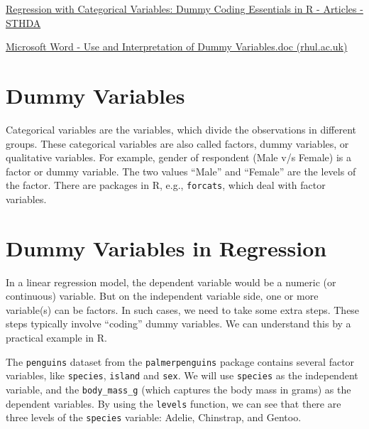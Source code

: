 \documentclass[
  letterpaper,
  paper =a4,
  twoside,
  openright,
  headsepline,
  footsepline,
  listof = totocnumbered,
  chapterprefix = true,
  firstiscover,
  parskip = full*]{scrbook}
\newenvironment{Shaded}{\begin{snugshade}}{\end{snugshade}}
\newcommand{\FunctionTok}[1]{\textcolor[rgb]{0.28,0.35,0.67}{#1}}
\newcommand{\NormalTok}[1]{\textcolor[rgb]{0.00,0.23,0.31}{#1}}
\newcommand{\OtherTok}[1]{\textcolor[rgb]{0.00,0.23,0.31}{#1}}
\newcommand{\SpecialCharTok}[1]{\textcolor[rgb]{0.37,0.37,0.37}{#1}}
\begin{document}
\href{http://sthda.com/english/articles/40-regression-analysis/163-regression-with-categorical-variables-dummy-coding-essentials-in-r/}{Regression
with Categorical Variables: Dummy Coding Essentials in R - Articles -
STHDA}

\href{http://www.personal.rhul.ac.uk/uhte/006/ec2203/Use\%20and\%20Interpretation\%20of\%20Dummy\%20Variables.pdf}{Microsoft
Word - Use and Interpretation of Dummy Variables.doc (rhul.ac.uk)}

\section{Dummy Variables}\label{dummy-variables}

Categorical variables are the variables, which divide the observations
in different groups. These categorical variables are also called
factors, dummy variables, or qualitative variables. For example, gender
of respondent (Male v/s Female) is a factor or dummy variable. The two
values ``Male'' and ``Female'' are the levels of the factor. There are
packages in R, e.g., \texttt{forcats}, which deal with factor variables.

\section{Dummy Variables in
Regression}\label{dummy-variables-in-regression}

In a linear regression model, the dependent variable would be a numeric
(or continuous) variable. But on the independent variable side, one or
more variable(s) can be factors. In such cases, we need to take some
extra steps. These steps typically involve ``coding'' dummy variables.
We can understand this by a practical example in R.

The \texttt{penguins} dataset from the \texttt{palmerpenguins} package
contains several factor variables, like \texttt{species},
\texttt{island} and \texttt{sex}. We will use \texttt{species} as the
independent variable, and the \texttt{body\_mass\_g} (which captures the
body mass in grams) as the dependent variables. By using the
\texttt{levels} function, we can see that there are three levels of the
\texttt{species} variable: Adelie, Chinstrap, and Gentoo.

\begin{Shaded}
\end{Shaded}
\end{document}
